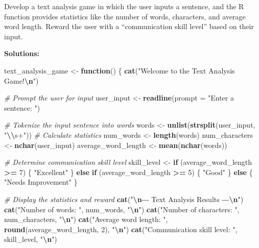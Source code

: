 \documentclass[
]{article}
\newenvironment{Shaded}{\begin{snugshade}}{\end{snugshade}}
\newcommand{\AttributeTok}[1]{\textcolor[rgb]{0.13,0.29,0.53}{#1}}
\newcommand{\CommentTok}[1]{\textcolor[rgb]{0.56,0.35,0.01}{\textit{#1}}}
\newcommand{\ControlFlowTok}[1]{\textcolor[rgb]{0.13,0.29,0.53}{\textbf{#1}}}
\newcommand{\DecValTok}[1]{\textcolor[rgb]{0.00,0.00,0.81}{#1}}
\newcommand{\FunctionTok}[1]{\textcolor[rgb]{0.13,0.29,0.53}{\textbf{#1}}}
\newcommand{\NormalTok}[1]{#1}
\newcommand{\OtherTok}[1]{\textcolor[rgb]{0.56,0.35,0.01}{#1}}
\newcommand{\SpecialCharTok}[1]{\textcolor[rgb]{0.81,0.36,0.00}{\textbf{#1}}}
\newcommand{\StringTok}[1]{\textcolor[rgb]{0.31,0.60,0.02}{#1}}
\begin{document}
Develop a text analysis game in which the user inputs a sentence, and
the R function provides statistics like the number of words, characters,
and average word length. Reward the user with a ``communication skill
level'' based on their input.

\textbf{Solutions:}

\begin{Shaded}
\begin{Highlighting}[]
\NormalTok{text\_analysis\_game }\OtherTok{\textless{}{-}} \ControlFlowTok{function}\NormalTok{() \{}
  \FunctionTok{cat}\NormalTok{(}\StringTok{"Welcome to the Text Analysis Game!}\SpecialCharTok{\textbackslash{}n}\StringTok{"}\NormalTok{)}
  
  \CommentTok{\# Prompt the user for input}
\NormalTok{  user\_input }\OtherTok{\textless{}{-}} \FunctionTok{readline}\NormalTok{(}\AttributeTok{prompt =} \StringTok{"Enter a sentence: "}\NormalTok{)}
  
  \CommentTok{\# Tokenize the input sentence into words}
\NormalTok{  words }\OtherTok{\textless{}{-}} \FunctionTok{unlist}\NormalTok{(}\FunctionTok{strsplit}\NormalTok{(user\_input, }\StringTok{"}\SpecialCharTok{\textbackslash{}\textbackslash{}}\StringTok{s+"}\NormalTok{))}
  \CommentTok{\# Calculate statistics}
\NormalTok{  num\_words }\OtherTok{\textless{}{-}} \FunctionTok{length}\NormalTok{(words)}
\NormalTok{  num\_characters }\OtherTok{\textless{}{-}} \FunctionTok{nchar}\NormalTok{(user\_input)}
\NormalTok{  average\_word\_length }\OtherTok{\textless{}{-}} \FunctionTok{mean}\NormalTok{(}\FunctionTok{nchar}\NormalTok{(words))}
  
  \CommentTok{\# Determine communication skill level}
\NormalTok{  skill\_level }\OtherTok{\textless{}{-}} \ControlFlowTok{if}\NormalTok{ (average\_word\_length }\SpecialCharTok{\textgreater{}=} \DecValTok{7}\NormalTok{) \{}
    \StringTok{"Excellent"}
\NormalTok{  \} }\ControlFlowTok{else} \ControlFlowTok{if}\NormalTok{ (average\_word\_length }\SpecialCharTok{\textgreater{}=} \DecValTok{5}\NormalTok{) \{}
    \StringTok{"Good"}
\NormalTok{  \} }\ControlFlowTok{else}\NormalTok{ \{}
    \StringTok{"Needs Improvement"}
\NormalTok{  \}}
  
  \CommentTok{\# Display the statistics and reward}
  \FunctionTok{cat}\NormalTok{(}\StringTok{"}\SpecialCharTok{\textbackslash{}n}\StringTok{{-}{-}{-} Text Analysis Results {-}{-}{-}}\SpecialCharTok{\textbackslash{}n}\StringTok{"}\NormalTok{)}
  \FunctionTok{cat}\NormalTok{(}\StringTok{"Number of words: "}\NormalTok{, num\_words, }\StringTok{"}\SpecialCharTok{\textbackslash{}n}\StringTok{"}\NormalTok{)}
  \FunctionTok{cat}\NormalTok{(}\StringTok{"Number of characters: "}\NormalTok{, num\_characters, }\StringTok{"}\SpecialCharTok{\textbackslash{}n}\StringTok{"}\NormalTok{)}
  \FunctionTok{cat}\NormalTok{(}\StringTok{"Average word length: "}\NormalTok{, }\FunctionTok{round}\NormalTok{(average\_word\_length, }\DecValTok{2}\NormalTok{), }\StringTok{"}\SpecialCharTok{\textbackslash{}n}\StringTok{"}\NormalTok{)}
  \FunctionTok{cat}\NormalTok{(}\StringTok{"Communication skill level: "}\NormalTok{, skill\_level, }\StringTok{"}\SpecialCharTok{\textbackslash{}n}\StringTok{"}\NormalTok{)}
  

\end{Highlighting}
\end{Shaded}
\end{document}
